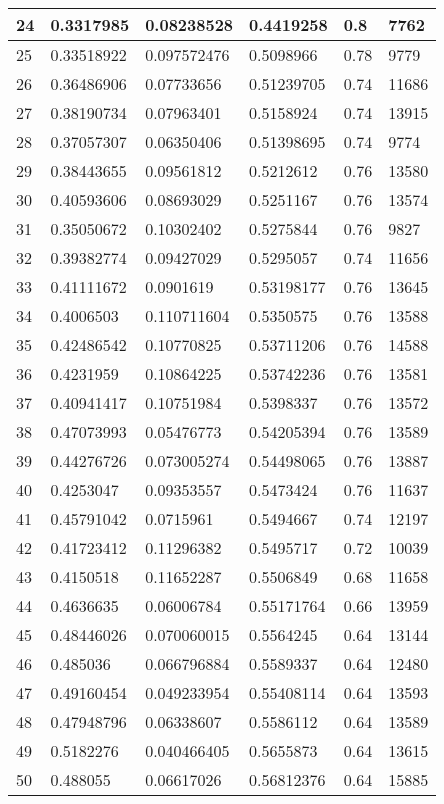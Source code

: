 \begin{longtable}{|l|l|l|l|l|l|}
24 & 0.3317985 & 0.08238528 & 0.4419258 & 0.8 & 7762 \\ \hline 
25 & 0.33518922 & 0.097572476 & 0.5098966 & 0.78 & 9779 \\ \hline 
26 & 0.36486906 & 0.07733656 & 0.51239705 & 0.74 & 11686 \\ \hline 
27 & 0.38190734 & 0.07963401 & 0.5158924 & 0.74 & 13915 \\ \hline 
28 & 0.37057307 & 0.06350406 & 0.51398695 & 0.74 & 9774 \\ \hline 
29 & 0.38443655 & 0.09561812 & 0.5212612 & 0.76 & 13580 \\ \hline 
30 & 0.40593606 & 0.08693029 & 0.5251167 & 0.76 & 13574 \\ \hline 
31 & 0.35050672 & 0.10302402 & 0.5275844 & 0.76 & 9827 \\ \hline 
32 & 0.39382774 & 0.09427029 & 0.5295057 & 0.74 & 11656 \\ \hline 
33 & 0.41111672 & 0.0901619 & 0.53198177 & 0.76 & 13645 \\ \hline 
34 & 0.4006503 & 0.110711604 & 0.5350575 & 0.76 & 13588 \\ \hline 
35 & 0.42486542 & 0.10770825 & 0.53711206 & 0.76 & 14588 \\ \hline 
36 & 0.4231959 & 0.10864225 & 0.53742236 & 0.76 & 13581 \\ \hline 
37 & 0.40941417 & 0.10751984 & 0.5398337 & 0.76 & 13572 \\ \hline 
38 & 0.47073993 & 0.05476773 & 0.54205394 & 0.76 & 13589 \\ \hline 
39 & 0.44276726 & 0.073005274 & 0.54498065 & 0.76 & 13887 \\ \hline 
40 & 0.4253047 & 0.09353557 & 0.5473424 & 0.76 & 11637 \\ \hline 
41 & 0.45791042 & 0.0715961 & 0.5494667 & 0.74 & 12197 \\ \hline 
42 & 0.41723412 & 0.11296382 & 0.5495717 & 0.72 & 10039 \\ \hline 
43 & 0.4150518 & 0.11652287 & 0.5506849 & 0.68 & 11658 \\ \hline 
44 & 0.4636635 & 0.06006784 & 0.55171764 & 0.66 & 13959 \\ \hline 
45 & 0.48446026 & 0.070060015 & 0.5564245 & 0.64 & 13144 \\ \hline 
46 & 0.485036 & 0.066796884 & 0.5589337 & 0.64 & 12480 \\ \hline 
47 & 0.49160454 & 0.049233954 & 0.55408114 & 0.64 & 13593 \\ \hline 
48 & 0.47948796 & 0.06338607 & 0.5586112 & 0.64 & 13589 \\ \hline 
49 & 0.5182276 & 0.040466405 & 0.5655873 & 0.64 & 13615 \\ \hline 
50 & 0.488055 & 0.06617026 & 0.56812376 & 0.64 & 15885 \\ \hline 
\end{longtable}